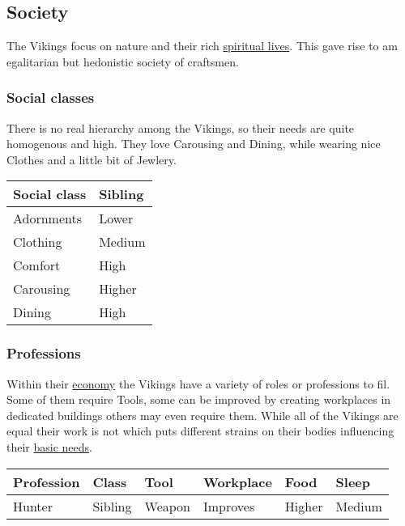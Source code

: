 \subsection{Society}\label{ch:Tribes:Vikings:Society}

The \gls{Vikings} focus on nature and their rich
\hyperref[ch:Tribes:Vikings:Religion]{spiritual lives}. This gave rise to am
egalitarian but hedonistic society of craftsmen.

\subsubsection{Social classes}\label{ch:Tribes:Vikings:Society:Classes}

There is no real hierarchy among the \gls{Vikings}, so their needs are quite
homogenous and high. They love \gls{Carousing} and \gls{Dining}, while wearing
nice \gls{Clothes} and a little bit of \gls{Jewlery}.

\begin{longtable}{ll}
	\toprule
	Social class     & Sibling \\
	\midrule
	\Gls{Adornments} & Lower   \\
	\Gls{Clothing}   & Medium  \\
	\gls{Comfort}    & High    \\
	\Gls{Carousing}  & Higher  \\
	\Gls{Dining}     & High    \\
	\bottomrule
\end{longtable}

\subsubsection{Professions}\label{ch:Tribes:Vikings:Professions}

Within their \hyperref[ch:Tribes:Vikings:Economy]{economy} the \gls{Vikings}
have a variety of roles or professions to fil. Some of them require
\glspl{Tool}, some can be improved by creating workplaces in dedicated
buildings others may even require them. While all of the \gls{Vikings} are
equal their work is not which puts different strains on their bodies
influencing their
\hyperref[ch:World:ch:World:Inhabitants:Sapients:Humans]{basic needs}.

\begin{longtable}{llllll}
	\toprule
	Profession & Class   & \Gls{Tool}   & Workplace & \Gls{Food} & \Gls{Sleep} \\
	\midrule
	Hunter     & Sibling & \Gls{Weapon} & Improves  & Higher     & Medium      \\
	\bottomrule
\end{longtable}
